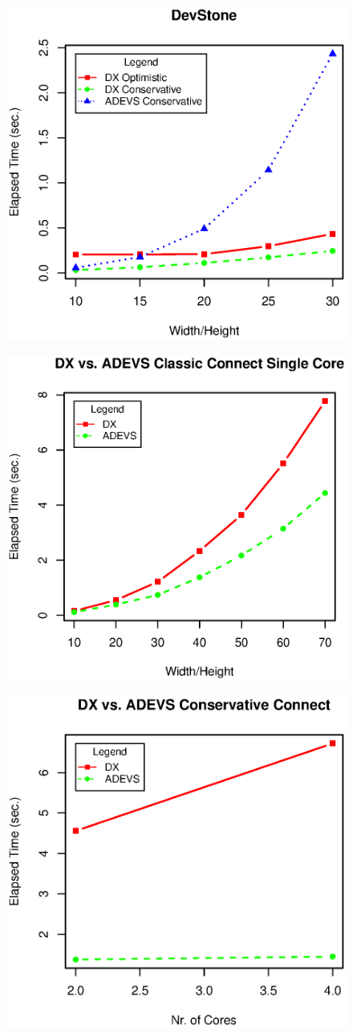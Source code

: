 \documentclass{scs}
\begin{document}
\begin{figure}[h]
	\includegraphics[width=.5\textwidth]{fig2.eps}
	\label{fig2.eps}
\end{figure}

\begin{figure}[h]
	\includegraphics[width=.5\textwidth]{fig3.eps}
	\label{fig3.eps}
\end{figure}

\begin{figure}[h]
	\includegraphics[width=.5\textwidth]{fig4.eps}
	\label{fig4.eps}
\end{figure}
\end{document}
